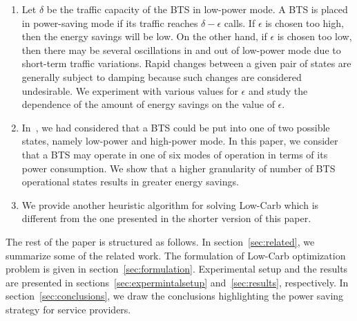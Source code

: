 \begin{enumerate}
\item Let $\delta$ be the traffic capacity of the BTS in low-power mode. A BTS is placed in power-saving mode if its traffic reaches $\delta - \epsilon$ calls. If $\epsilon$ is chosen too high, then the energy savings will be low. On the other hand, if $\epsilon$ is chosen too low, then there may be several oscillations in and out of low-power mode due to short-term traffic variations. Rapid changes between a given pair of states are generally subject to damping because such changes are considered undesirable. We experiment with various values for $\epsilon$ and study the dependence of the amount of energy savings on the value of $\epsilon$.
\item In~\cite{ilyas:lowcarb:globecom13}, we had considered that a BTS could be put into one of two possible states, namely low-power and high-power mode. In this paper, we consider that a BTS may operate in one of six modes of operation in terms of its power consumption. We show that a higher granularity of number of BTS operational states results in greater energy savings.
\item We provide another heuristic algorithm for solving Low-Carb which is different from the one presented in the shorter version of this paper.
\end{enumerate}
The rest of the paper is structured as follows. In section~\ref{sec:related}, we summarize some of the related work. The formulation
of Low-Carb optimization problem is given in
section~\ref{sec:formulation}. Experimental setup and the
results are presented in sections~\ref{sec:expermintalsetup}
and~\ref{sec:results}, respectively. In
section~\ref{sec:conclusions}, we draw the conclusions
highlighting the power saving strategy for service providers.